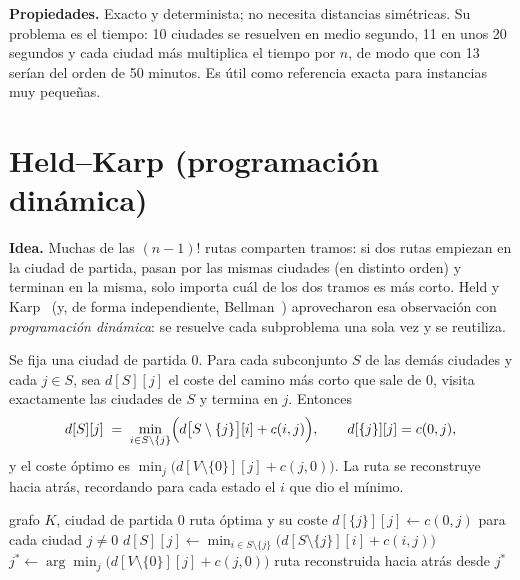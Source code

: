 \textbf{Propiedades.} Exacto y determinista; no necesita distancias simétricas. Su problema es el tiempo: 10 ciudades se resuelven en medio segundo, 11 en unos 20 segundos y cada ciudad más multiplica el tiempo por $n$, de modo que con 13 serían
del orden de 50 minutos. Es útil como referencia exacta para instancias muy pequeñas.

\section{Held--Karp (programación dinámica)}\label{sec:heldkarp}

\textbf{Idea.} Muchas de las $(n-1)!$ rutas comparten tramos: si dos rutas empiezan en la ciudad de partida, pasan por las mismas ciudades (en distinto orden) y terminan en la misma, solo importa cuál de los dos tramos es más
corto. Held y Karp~\cite{heldkarp1962} (y, de forma independiente, Bellman~\cite{bellman1962}) aprovecharon esa observación con \emph{programación dinámica}: se resuelve cada subproblema una sola vez y se reutiliza.

Se fija una ciudad de partida $0$. Para cada subconjunto $S$ de las demás ciudades y cada $j\in S$, sea $d[S][j]$ el coste del camino más corto que sale de $0$, visita exactamente las ciudades de $S$ y termina en $j$. Entonces
\begin{equation}\label{eq:heldkarp}
  d[S][j]\;=\;\min_{i\in S\setminus\{j\}}\Bigl(d\bigl[S\setminus\{j\}\bigr][i]+c(i,j)\Bigr),\qquad d[\{j\}][j]=c(0,j),
\end{equation}
y el coste óptimo es $\min_{j}\bigl(d[V\setminus\{0\}][j]+c(j,0)\bigr)$. La ruta se reconstruye hacia atrás, recordando para cada estado el $i$ que dio el mínimo.

\begin{algorithm}[htbp]
  \caption{Held--Karp}\label{alg:hk}
  \begin{algorithmic}[1]
    \Require grafo $K$, ciudad de partida $0$
    \Ensure ruta óptima y su coste
    \State $d[\{j\}][j] \gets c(0,j)$ para cada ciudad $j\neq 0$
     
        \State $d[S][j] \gets \min_{i\in S\setminus\{j\}}\bigl(d[S\setminus\{j\}][i]+c(i,j)\bigr)$
      \EndFor
    \EndFor
    \State $j^{*} \gets \arg\min_j\bigl(d[V\setminus\{0\}][j]+c(j,0)\bigr)$
    \State \Return ruta reconstruida hacia atrás desde $j^{*}$
  \end{algorithmic}
\end{algorithm}

